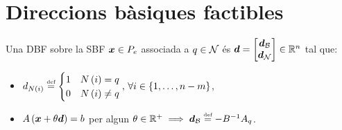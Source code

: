 \section{Direccions bàsiques factibles}
\begin{defi}
    Una DBF sobre la SBF $\boldsymbol{x} \in P_e$ associada a $q \in \mathcal{N}$ és $\boldsymbol{d} =
    \begin{bmatrix}
        \boldsymbol{d}_{\mathcal{B}} \\
        \boldsymbol{d}_{\mathcal{N}}
    \end{bmatrix}
    \in \mathbb{R}^n$ tal que:
    \begin{itemize}
        \item $d_{N\left(i\right)} \stackrel{\text{\tiny def}}{=}
            \begin{cases}
                1 & N\left(i\right) = q \\
                0 & N\left(i\right) \neq q
            \end{cases}
            ,\, \forall i \in \left\{1, \dots, n-m \right\}$,
        \item $A \left(\boldsymbol{x} + \theta \boldsymbol{d}\right) = b$ per algun $\theta \in \mathbb{R}^+ \implies \boldsymbol{d}_{\mathcal{B}} \stackrel{\text{\tiny def}}{=} -B^{-1} A_q$.
    \end{itemize}
\end{defi}

